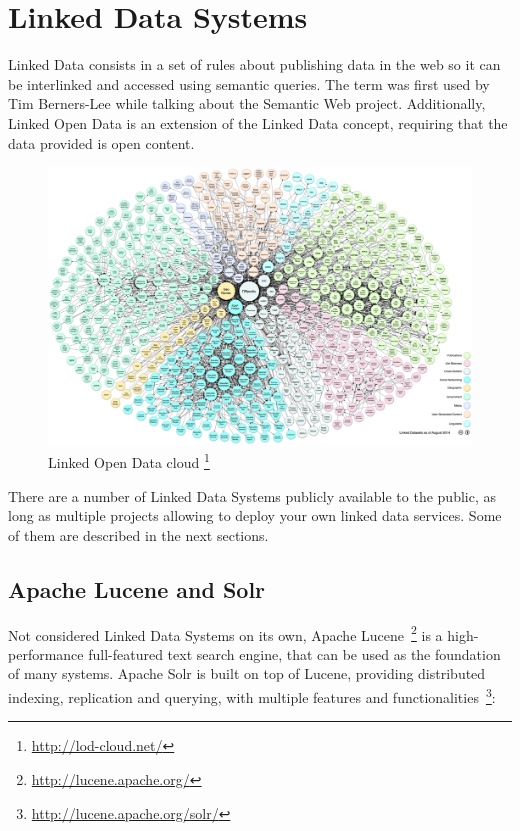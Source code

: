 
\section{Linked Data Systems}
\label{sec:linkd_sys}

Linked Data consists in a set of rules about publishing data in the web so it can be interlinked and accessed using semantic queries. The term was first used by Tim Berners-Lee while talking about the Semantic Web project. Additionally, Linked Open Data is an extension of the Linked Data concept, requiring that the data provided is open content.

\begin{figure}[!htbp]
  \begin{minipage}{\linewidth}
    \centering
    \includegraphics[width=\textwidth]{img/enabling/lod-cloud.png}
    \caption[Linked Open Data cloud]{%
      Linked Open Data cloud%
      \footnote{\url{http://lod-cloud.net/}}%
      }
    \label{fig:arch2}
  \end{minipage}
\end{figure}

There are a number of Linked Data Systems publicly available to the public, as long as multiple projects allowing to deploy your own linked data services. Some of them are described in the next sections. 

\subsection{Apache Lucene and Solr}
\label{sec:statesolr}

Not considered Linked Data Systems on its own, Apache Lucene~\footnote{\url{http://lucene.apache.org/}} is a high-performance full-featured text search engine, that can be used as the foundation of many systems. Apache Solr is built on top of Lucene, providing distributed indexing, replication and querying, with multiple features and functionalities~\footnote{\url{http://lucene.apache.org/solr/}}:

